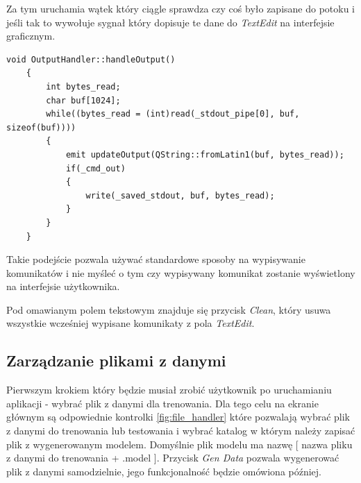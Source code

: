 \documentclass[paper=a4, fontsize=11pt]{scrartcl} %
\numberwithin{equation}{section} %
\numberwithin{figure}{section} %
\begin{document}
    \par Za tym uruchamia wątek który ciągle sprawdza czy coś było zapisane do potoku i jeśli
    tak to wywołuje sygnał który dopisuje te dane do \textit{TextEdit} na interfejsie graficznym.

    \newpage
    \begin{lstlisting}[caption={Funkcja uruchamiana w wątku},captionpos=b]
    void OutputHandler::handleOutput()
    {
        int bytes_read;
        char buf[1024];
        while((bytes_read = (int)read(_stdout_pipe[0], buf, sizeof(buf))))
        {
            emit updateOutput(QString::fromLatin1(buf, bytes_read));
            if(_cmd_out)
            {
                write(_saved_stdout, buf, bytes_read);
            }
        }
    }
    \end{lstlisting}

    \par Takie podejście pozwala używać standardowe sposoby na wypisywanie komunikatów i nie
    myśleć o tym czy wypisywany komunikat zostanie wyświetlony na interfejsie użytkownika.
    \par Pod omawianym polem tekstowym znajduje się przycisk \textit{Clean}, który usuwa
    wszystkie wcześniej wypisane komunikaty z pola \textit{TextEdit}. 

\subsection{Zarządzanie plikami z danymi}

    \par Pierwszym krokiem który będzie musiał zrobić użytkownik po uruchamianiu aplikacji -
    wybrać plik z danymi dla trenowania. Dla tego celu na ekranie głównym są odpowiednie
    kontrolki \ref{fig:file_handler} które pozwalają wybrać plik z danymi do trenowania lub
    testowania i wybrać katalog w którym należy zapisać plik z wygenerowanym modelem. Domyślnie
    plik modelu ma nazwę [ nazwa pliku z danymi do trenowania + .model ]. Przycisk \textit{Gen
    Data} pozwala wygenerować plik z danymi samodzielnie, jego funkcjonalność będzie omówiona
    później.
\end{document}
